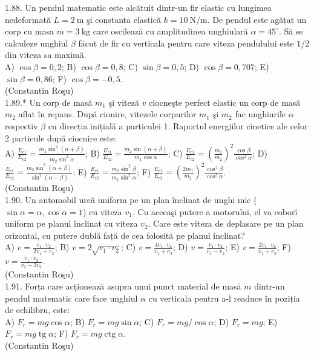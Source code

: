 1.88. Un pendul matematic este alcătuit dintr-un fir elastic cu lungimea nedeformată $L=2 \mathrm{~m}$ şi constanta elastică $k=10 \mathrm{~N} / \mathrm{m}$. De pendul este agățat un corp cu masa $m=3 \mathrm{~kg}$ care oscilează cu amplitudinea unghiulară $\alpha=45^{\circ}$. Să se calculeze unghiul $\beta$ făcut de fir cu verticala pentru care viteza pendulului este $1 / 2$ din viteza sa maximă.\\ A) $\cos \beta=0,2$; B) $\cos \beta=0,8$; C) $\sin \beta=0,5$; D) $\cos \beta=0,707$; E) $\sin \beta=0,86$; F) $\cos \beta=-0,5$.\\ (Constantin Roşu)\\

1.89.* Un corp de masă $m_{1}$ şi viteză $v$ ciocneşte perfect elastic un corp de masă $m_{2}$ aflat în repaus. După cionire, vitezele corpurilor $m_{1}$ şi $m_{2}$ fac unghiurile $\alpha$ respectiv $\beta$ cu direcția inițialǎ a particulei 1. Raportul energiilor cinetice ale celor 2 particule după ciocnire este:\\ A) $\frac{E_{c 1}}{E_{c 2}}=\frac{m_{1} \sin ^{2}(\alpha+\beta)}{m_{2} \sin ^{2} \alpha}$; B) $\frac{E_{c 1}}{E_{c 2}}=\frac{m_{2} \sin (\alpha+\beta)}{m_{1} \cos \alpha}$; C) $\frac{E_{c 1}}{E_{c 2}}=\left(\frac{m_{1}}{m_{2}}\right)^{2} \frac{\cos \beta}{\cos ^{2} \alpha}$; D) $\frac{E_{c 1}}{E_{c 2}}=\frac{m_{2} \sin ^{2}(\alpha+\beta)}{\sin ^{2}(\alpha-\beta)}$; E) $\frac{E_{c 1}}{E_{c 2}}=\frac{m_{2} \sin ^{2} \beta}{m_{1} \sin ^{2} \alpha}$; F) $\frac{E_{c 1}}{E_{c 2}}=\left(\frac{2 m_{1}}{m_{2}}\right)^{2} \frac{\cos ^{2} \beta}{\cos ^{2} \alpha}$.\\ (Constantin Roşu)\\

1.90. Un automobil urcă uniform pe un plan înclinat de unghi mic ($\sin \alpha=\alpha, \cos \alpha=1$) cu viteza $v_{1}$. Cu aceeaşi putere a motorului, el va coborî uniform pe planul înclinat cu viteza $v_{2}$. Care este viteza de deplasare pe un plan orizontal, cu putere dublă față de cea folosită pe planul înclinat?\\ A) $v=\frac{v_{1} \cdot v_{2}}{2 v_{1}+v_{2}}$; B) $v=2 \sqrt{v_{1} \cdot v_{2}}$; C) $v=\frac{4 v_{1} \cdot v_{2}}{v_{1}+v_{2}}$; D) $v=\frac{v_{1} \cdot v_{2}}{v_{1}-v_{2}}$; E) $v=\frac{2 v_{1} \cdot v_{2}}{v_{1}+v_{2}}$; F) $v=\frac{v_{1} \cdot v_{2}}{v_{1}-2 v_{2}}$.\\ (Constantin Roşu)\\

1.91. Forța care acționează asupra unui punct material de masă $m$ dintr-un pendul matematic care face unghiul $\alpha$ cu verticala pentru a-l readuce în poziția de echilibru, este:\\ A) $F_{r}=m g \cos \alpha$; B) $F_{r}=m g \sin \alpha$; C) $F_{r}=m g / \cos \alpha$; D) $F_{r}=m g$; E) $F_{r}=m g \operatorname{tg} \alpha$; F) $F_{r}=m g \operatorname{ctg} \alpha$.\\ (Constantin Roşu)\\

